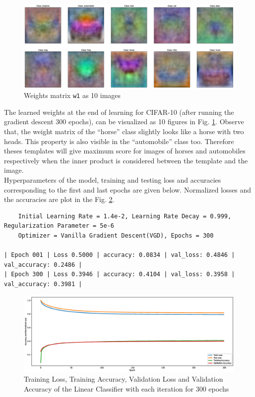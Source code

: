 \documentclass[a4paper,11pt]{article}%
\begin{document}
\begin{figure}[!h]
	\centering
	\includegraphics[scale=0.29]{figures/trainedWeightsp1}
	\caption{\footnotesize Weights matrix {\tt w1} as 10 images}
	\label{part1w}
\end{figure}

The learned weights at the end of learning for CIFAR-10 (after running the gradient descent 300 epochs), can be visualized as 10 figures in Fig. \ref{part1w}. Observe that, the weight matrix of the ``horse'' class slightly looks like a horse with two heads. This property is also visible in the ``automobile'' class too. Therefore theses templates will give maximum score for images of horses and automobiles respectively when the inner product is considered between the template and the image.\\

Hyperparameters of the  model, training and testing loss and accuracies corresponding to the first and last epochs are given below. Normalized losses and the accuracies are plot in the Fig. \ref{p1}.


\begin{verbatim}
	Initial Learning Rate = 1.4e-2, Learning Rate Decay = 0.999, Regularization Parameter = 5e-6
	Optimizer = Vanilla Gradient Descent(VGD), Epochs = 300
	
| Epoch 001 | Loss 0.5000 | accuracy: 0.0834 | val_loss: 0.4846 | val_accuracy: 0.2486 |
| Epoch 300 | Loss 0.3946 | accuracy: 0.4104 | val_loss: 0.3958 | val_accuracy: 0.3981 |
\end{verbatim}

\begin{figure}[!h]
	\centering
	\includegraphics[scale=0.3]{figures/part1plots}
	\caption{\footnotesize Training Loss, Training Accuracy, Validation Loss and Validation Accuracy of the Linear Classifier with each iteration for 300 epochs}
	\label{p1}
\end{figure}
\end{document}
